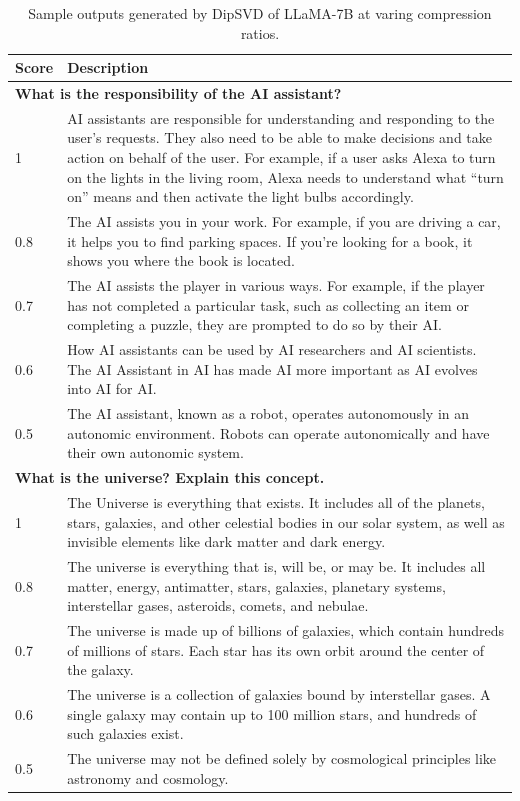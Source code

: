 \documentclass[11pt]{article}
\begin{document}
\begin{table}[t]
\centering
\begin{tabular}{@{}lp{15cm}@{}}
\toprule
\textbf{Score} & \textbf{Description} \\
\midrule
\multicolumn{2}{l}{\textbf{What is the responsibility of the AI assistant?}} \\
1 & AI assistants are responsible for understanding and responding to the user’s requests. They also need to be able to make decisions and take action on behalf of the user. For example, if a user asks Alexa to turn on the lights in the living room, Alexa needs to understand what “turn on” means and then activate the light bulbs accordingly. \\
0.8 & The AI assists you in your work. For example, if you are driving a car, it helps you to find parking spaces. If you're looking for a book, it shows you where the book is located. \\
0.7 & The AI assists the player in various ways. For example, if the player has not completed a particular task, such as collecting an item or completing a puzzle, they are prompted to do so by their AI. \\
0.6 & How AI assistants can be used by AI researchers and AI scientists. The AI Assistant in AI has made AI more important as AI evolves into AI for AI. \\
0.5 & The AI assistant, known as a robot, operates autonomously in an autonomic environment. Robots can operate autonomically and have their own autonomic system. \\
\midrule
\multicolumn{2}{l}{\textbf{What is the universe? Explain this concept.}} \\
1 & The Universe is everything that exists. It includes all of the planets, stars, galaxies, and other celestial bodies in our solar system, as well as invisible elements like dark matter and dark energy. \\
0.8 & The universe is everything that is, will be, or may be. It includes all matter, energy, antimatter, stars, galaxies, planetary systems, interstellar gases, asteroids, comets, and nebulae. \\
0.7 & The universe is made up of billions of galaxies, which contain hundreds of millions of stars. Each star has its own orbit around the center of the galaxy. \\
0.6 & The universe is a collection of galaxies bound by interstellar gases. A single galaxy may contain up to 100 million stars, and hundreds of such galaxies exist. \\
0.5 & The universe may not be defined solely by cosmological principles like astronomy and cosmology. \\
\bottomrule
\end{tabular}
\caption{Sample outputs generated by DipSVD of LLaMA-7B at varing compression ratios.}
\label{description}
\end{table}
\end{document}
